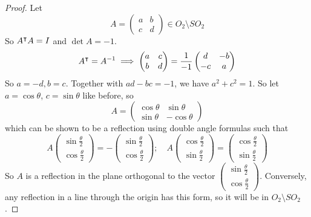 \documentclass{article}
\begin{document}
\begin{proof}
    Let
    \[ A = \begin{pmatrix}
            a & b \\ c & d
        \end{pmatrix} \in O_2 \setminus SO_2 \]
    So $A^\intercal A = I$ and $\det A = -1$.
    \[ A^\intercal = A^{-1} \implies \begin{pmatrix}
            a & c \\ b & d
        \end{pmatrix} = \frac{1}{-1} \begin{pmatrix}
            d & -b \\ -c & a
        \end{pmatrix} \]
    So $a=-d, b=c$. Together with $ad-bc=-1$, we have $a^2 + c^2 = 1$. So let $a = \cos \theta$, $c = \sin \theta$ like before, so
    \[ A = \begin{pmatrix}
            \cos \theta & \sin \theta  \\
            \sin \theta & -\cos \theta
        \end{pmatrix} \]
    which can be shown to be a reflection using double angle formulas such that
    \[ A \begin{pmatrix}
            \sin \frac{\theta}{2} \\ \cos \frac{\theta}{2}
        \end{pmatrix} = -\begin{pmatrix}
            \sin \frac{\theta}{2} \\ \cos \frac{\theta}{2}
        \end{pmatrix};\quad A\begin{pmatrix}
            \cos \frac{\theta}{2} \\ \sin \frac{\theta}{2}
        \end{pmatrix} = \begin{pmatrix}
            \cos \frac{\theta}{2} \\ \sin \frac{\theta}{2}
        \end{pmatrix} \]
    So $A$ is a reflection in the plane orthogonal to the vector $\begin{pmatrix}
            \sin \frac{\theta}{2} \\ \cos \frac{\theta}{2}
        \end{pmatrix}$. Conversely, any reflection in a line through the origin has this form, so it will be in $O_2 \setminus SO_2$.
\end{proof}
\end{document}

